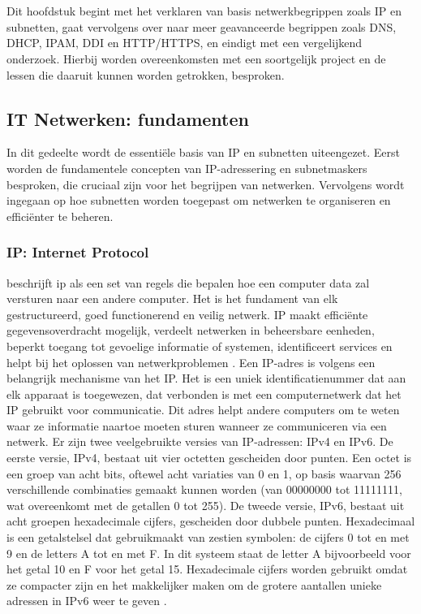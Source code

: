 \chapter{}%
\label{ch:stand-van-zaken}
Dit hoofdstuk begint met het verklaren van basis netwerkbegrippen zoals IP en subnetten, gaat vervolgens over naar meer geavanceerde begrippen zoals DNS, DHCP, IPAM, DDI en HTTP/HTTPS, en eindigt met een vergelijkend onderzoek. Hierbij worden overeenkomsten met een soortgelijk project en de lessen die daaruit kunnen worden getrokken, besproken.


\section{IT Netwerken: fundamenten}
In dit gedeelte wordt de essentiële basis van IP en subnetten uiteengezet. Eerst worden de fundamentele concepten van IP-adressering en subnetmaskers besproken, die cruciaal zijn voor het begrijpen van netwerken. Vervolgens wordt ingegaan op hoe subnetten worden toegepast om netwerken te organiseren en efficiënter te beheren.

\subsection{IP: Internet Protocol}
\textcite{Postel1981} beschrijft \acrfull{ip} als een set van regels die bepalen hoe een computer data zal versturen naar een andere computer. Het is het fundament van elk gestructureerd, goed functionerend en veilig netwerk. IP maakt efficiënte gegevensoverdracht mogelijk, verdeelt netwerken in beheersbare eenheden, beperkt toegang tot gevoelige informatie of systemen, identificeert services en helpt bij het oplossen van netwerkproblemen \autocite{Postel1981}. Een IP-adres is volgens \textcite{Postel1981} een belangrijk mechanisme van het IP. Het is een uniek identificatienummer dat aan elk apparaat is toegewezen, dat verbonden is met een computernetwerk dat het IP gebruikt voor communicatie. Dit adres helpt andere computers om te weten waar ze informatie naartoe moeten sturen wanneer ze communiceren via een netwerk.
Er zijn twee veelgebruikte versies van IP-adressen: IPv4 en IPv6. De eerste versie, IPv4, bestaat uit vier octetten gescheiden door punten\autocite{Postel1981}. Een octet is een groep van acht bits, oftewel acht variaties van 0 en 1, op basis waarvan 256 verschillende combinaties gemaakt kunnen worden (van 00000000 tot 11111111, wat overeenkomt met de getallen 0 tot 255)\autocite{Postel1981}. De tweede versie, IPv6, bestaat uit acht groepen hexadecimale cijfers, gescheiden door dubbele punten. Hexadecimaal is een getalstelsel dat gebruikmaakt van zestien symbolen: de cijfers 0 tot en met 9 en de letters A tot en met F. In dit systeem staat de letter A bijvoorbeeld voor het getal 10 en F voor het getal 15. Hexadecimale cijfers worden gebruikt omdat ze compacter zijn en het makkelijker maken om de grotere aantallen unieke adressen in IPv6 weer te geven \autocite{CabellosAparicio2005}.

